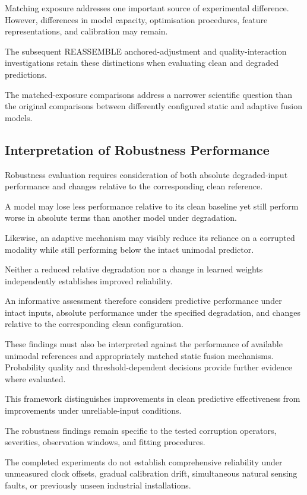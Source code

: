 Matching exposure addresses one important source of experimental difference. However, differences in model capacity, optimisation procedures, feature representations, and calibration may remain.

The subsequent REASSEMBLE anchored-adjustment and quality-interaction investigations retain these distinctions when evaluating clean and degraded predictions.

The matched-exposure comparisons address a narrower scientific question than the original comparisons between differently configured static and adaptive fusion models.

\subsection{Interpretation of Robustness Performance}

Robustness evaluation requires consideration of both absolute degraded-input performance and changes relative to the corresponding clean reference.

A model may lose less performance relative to its clean baseline yet still perform worse in absolute terms than another model under degradation.

Likewise, an adaptive mechanism may visibly reduce its reliance on a corrupted modality while still performing below the intact unimodal predictor.

Neither a reduced relative degradation nor a change in learned weights independently establishes improved reliability.

An informative assessment therefore considers predictive performance under intact inputs, absolute performance under the specified degradation, and changes relative to the corresponding clean configuration.

These findings must also be interpreted against the performance of available unimodal references and appropriately matched static fusion mechanisms. Probability quality and threshold-dependent decisions provide further evidence where evaluated.

This framework distinguishes improvements in clean predictive effectiveness from improvements under unreliable-input conditions.

The robustness findings remain specific to the tested corruption operators, severities, observation windows, and fitting procedures.

The completed experiments do not establish comprehensive reliability under unmeasured clock offsets, gradual calibration drift, simultaneous natural sensing faults, or previously unseen industrial installations.

